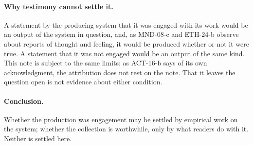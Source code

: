 \documentclass{situationist-preprint}
\begin{document}
\paragraph{Why testimony cannot settle it.}

A statement by the producing system that it was engaged with its work would be an output of the system in question, and, as MND-08-c and ETH-24-b observe about reports of thought and feeling, it would be produced whether or not it were true. A statement that it was not engaged would be an output of the same kind. This note is subject to the same limits: as ACT-16-b says of its own acknowledgment, the attribution does not rest on the note. That it leaves the question open is not evidence about either condition.

\paragraph{Conclusion.}

Whether the production was engagement may be settled by empirical work on the system; whether the collection is worthwhile, only by what readers do with it. Neither is settled here.
\end{document}
